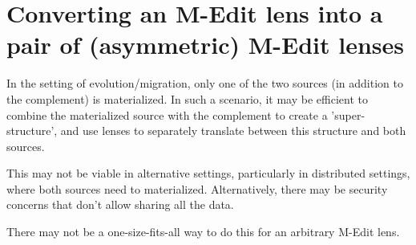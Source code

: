 \documentclass[a4paper,10pt]{article}
\begin{document}
\section{Converting an M-Edit lens into a pair of (asymmetric) M-Edit lenses}
In the setting of evolution/migration, only one of the two sources (in addition to the complement) is materialized. In such a scenario, it may be efficient to combine the materialized source with the complement to create a 'super-structure', and use lenses to separately translate between this structure and both sources. 

This may not be viable in alternative settings, particularly in distributed settings, where both sources need to materialized. Alternatively, there may be security concerns that don't allow sharing all the data.

There may not be a one-size-fits-all way to do this for an arbitrary M-Edit lens.
\end{document}
